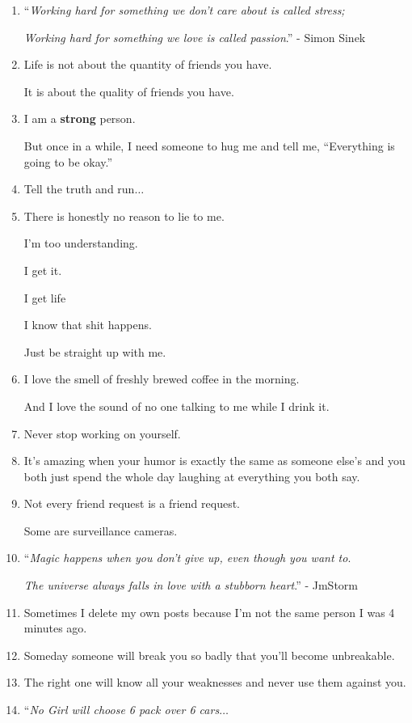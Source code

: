 \documentclass{article}
\numberwithin{equation}{section}
\begin{document}
\begin{enumerate}
    \textit{If you removed all of your effort from the equation would any communication remain between you?}
    
    \textit{If not, there is nothing there, and you deserve better}.'' - Beau Taplin
    \item ``\textit{Working hard for something we don't care about is called stress;}
    
    \textit{Working hard for something we love is called passion}.'' - Simon Sinek
    \item Life is not about the quantity of friends you have.
    
    It is about the quality of friends you have.
    \item I am a \textbf{strong} person.
    
    But once in a while, I need someone to hug me and tell me, ``Everything is going to be okay.''
    \item Tell the truth and run$\ldots$
    \item There is honestly no reason to lie to me.
    
    I'm too understanding.
    
    I get it.
    
    I get life
    
    I know that shit happens.
    
    Just be straight up with me.
    \item I love the smell of freshly brewed coffee in the morning.
    
    And I love the sound of no one talking to me while I drink it.
    \item Never stop working on yourself.
    \item It's amazing when your humor is exactly the same as someone else's and you both just spend the whole day laughing at everything you both say.
    \item Not every friend request is a friend request.
    
    Some are surveillance cameras.
    \item ``\textit{Magic happens when you don't give up, even though you want to}.
    
    \textit{The universe always falls in love with a stubborn heart}.'' - JmStorm
    \item Sometimes I delete my own posts because I'm not the same person I was 4 minutes ago.
    \item Someday someone will break you so badly that you'll become unbreakable.
    \item The right one will know all your weaknesses and never use them against you.
    \item ``\textit{No Girl will choose 6 pack over 6 cars}$\ldots$
    

\end{enumerate}
\end{document}

